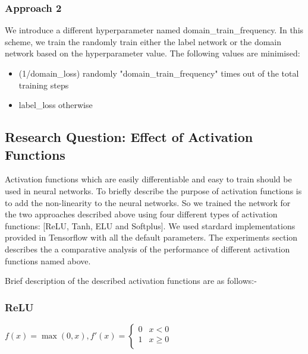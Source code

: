 \documentclass[11pt,a4paper]{article}
\begin{document}
\subsubsection{Approach 2}
We introduce a different hyperparameter named domain\_train\_frequency. In this scheme, we train the randomly train either the label network or the domain network based on the hyperparameter value. The following values are minimised:

\begin{itemize}
  \item (1/domain\_loss) randomly "domain\_train\_frequency" times out of the total training steps
  \item label\_loss otherwise
\end{itemize}

\subsection{Research Question: Effect of Activation Functions}
Activation functions which are easily differentiable and easy to train should be used in neural networks. To briefly describe the purpose of activation functions is to add the non-linearity to the neural networks. So we trained the network for the two approaches described above using four different types of activation functions: [ReLU, Tanh, ELU and Softplus].
We used stardard implementations provided in Tensorflow with all the default parameters. The experiments section describes the a comparative analysis of the performance of different activation functions named above.

Brief description of the described activation functions are as follows:-
\subsubsection{ReLU}
$f(x)= \max(0,x), f'(x) = \begin{cases}
      0 & x < 0 \\
      1 & x\geq 0 \\
   \end{cases}$
\end{document}
